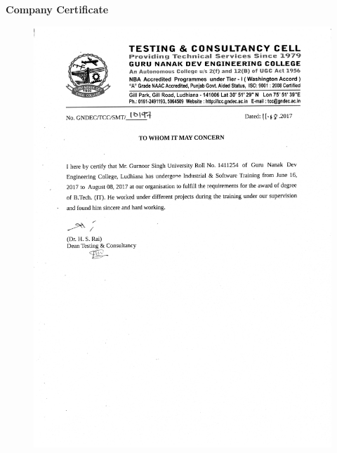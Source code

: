 \begin{center}
{\Huge \bf{Company Certificate}\vskip 0.2in}
\end{center}
\begin{figure}[ht]
\centering
\includegraphics[scale=0.6]{input/images/tcc1.png}
\caption{}
\end{figure}\newpage\begin{figure}[ht]
\centering

\end{figure}
